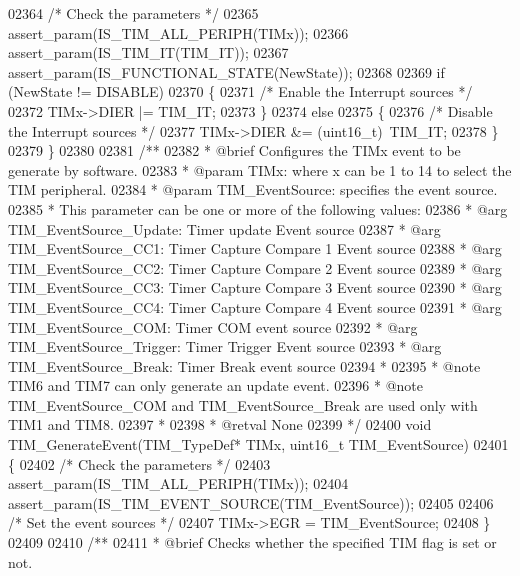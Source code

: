 \begin{DoxyCode}
02364   \textcolor{comment}{/* Check the parameters */}
02365   assert_param(IS\_TIM\_ALL\_PERIPH(TIMx));
02366   assert_param(IS\_TIM\_IT(TIM\_IT));
02367   assert_param(IS\_FUNCTIONAL\_STATE(NewState));
02368 
02369   \textcolor{keywordflow}{if} (NewState != DISABLE)
02370   \{
02371     \textcolor{comment}{/* Enable the Interrupt sources */}
02372     TIMx->DIER |= TIM\_IT;
02373   \}
02374   \textcolor{keywordflow}{else}
02375   \{
02376     \textcolor{comment}{/* Disable the Interrupt sources */}
02377     TIMx->DIER &= (uint16\_t)~TIM\_IT;
02378   \}
02379 \}
02380 
02381 \textcolor{comment}{/**}
02382 \textcolor{comment}{  * @brief  Configures the TIMx event to be generate by software.}
02383 \textcolor{comment}{  * @param  TIMx: where x can be 1 to 14 to select the TIM peripheral.}
02384 \textcolor{comment}{  * @param  TIM\_EventSource: specifies the event source.}
02385 \textcolor{comment}{  *          This parameter can be one or more of the following values:    }
02386 \textcolor{comment}{  *            @arg TIM\_EventSource\_Update: Timer update Event source}
02387 \textcolor{comment}{  *            @arg TIM\_EventSource\_CC1: Timer Capture Compare 1 Event source}
02388 \textcolor{comment}{  *            @arg TIM\_EventSource\_CC2: Timer Capture Compare 2 Event source}
02389 \textcolor{comment}{  *            @arg TIM\_EventSource\_CC3: Timer Capture Compare 3 Event source}
02390 \textcolor{comment}{  *            @arg TIM\_EventSource\_CC4: Timer Capture Compare 4 Event source}
02391 \textcolor{comment}{  *            @arg TIM\_EventSource\_COM: Timer COM event source  }
02392 \textcolor{comment}{  *            @arg TIM\_EventSource\_Trigger: Timer Trigger Event source}
02393 \textcolor{comment}{  *            @arg TIM\_EventSource\_Break: Timer Break event source}
02394 \textcolor{comment}{  * }
02395 \textcolor{comment}{  * @note   TIM6 and TIM7 can only generate an update event. }
02396 \textcolor{comment}{  * @note   TIM\_EventSource\_COM and TIM\_EventSource\_Break are used only with TIM1 and TIM8.}
02397 \textcolor{comment}{  *        }
02398 \textcolor{comment}{  * @retval None}
02399 \textcolor{comment}{  */}
02400 \textcolor{keywordtype}{void} TIM_GenerateEvent(TIM\_TypeDef* TIMx, uint16\_t TIM\_EventSource)
02401 \{
02402   \textcolor{comment}{/* Check the parameters */}
02403   assert_param(IS\_TIM\_ALL\_PERIPH(TIMx));
02404   assert_param(IS\_TIM\_EVENT\_SOURCE(TIM\_EventSource));
02405 
02406   \textcolor{comment}{/* Set the event sources */}
02407   TIMx->EGR = TIM\_EventSource;
02408 \}
02409 
02410 \textcolor{comment}{/**}
02411 \textcolor{comment}{  * @brief  Checks whether the specified TIM flag is set or not.}

\end{DoxyCode}
